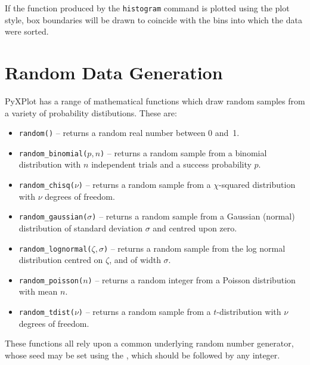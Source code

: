 If the function produced by the {\tt histogram} command is plotted using the
 plot style, box boundaries will be drawn to coincide with the
bins into which the data were sorted.

\section{Random Data Generation}

PyXPlot has a range of mathematical functions which draw random samples from a
variety of probability distibutions. These are:

\begin{itemize}
\item {\tt random()} -- returns a random real number between 0 and~1.
\item {\tt random\_binomial($p,n$)} -- returns a random sample from a binomial distribution with $n$ independent trials and a success probability $p$.
\item {\tt random\_chisq($\nu$)} -- returns a random sample from a $\chi$-squared distribution with $\nu$ degrees of freedom.
\item {\tt random\_gaussian($\sigma$)} -- returns a random sample from a Gaussian (normal) distribution of standard deviation $\sigma$ and centred upon zero.
\item {\tt random\_lognormal($\zeta,\sigma$)} -- returns a random sample from the log normal distribution centred on $\zeta$, and of width $\sigma$.
\item {\tt random\_poisson($n$)} -- returns a random integer from a Poisson distribution with mean $n$.
\item {\tt random\_tdist($\nu$)} -- returns a random sample from a $t$-distribution with $\nu$ degrees of freedom.
\end{itemize}

\noindent These functions all rely upon a common underlying random number
generator, whose seed may be set using the , which should be
followed by any integer.

